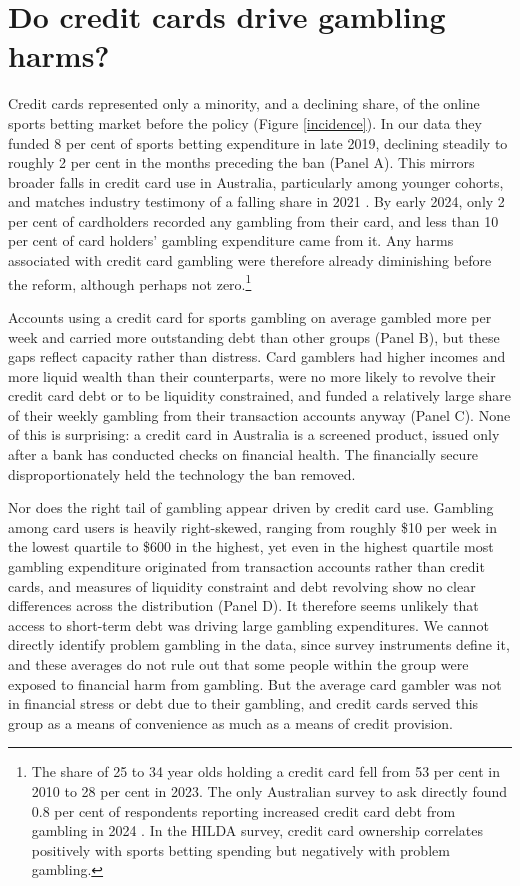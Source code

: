 \documentclass[11pt]{article}
\begin{document}
\section{Do credit cards drive gambling harms?} \label{Incidence}

Credit cards represented only a minority, and a declining share, of the online sports betting market before the policy (Figure \ref{incidence}). In our data they funded 8 per cent of sports betting expenditure in late 2019, declining steadily to roughly 2 per cent in the months preceding the ban (Panel A). This mirrors broader falls in credit card use in Australia, particularly among younger cohorts, and matches industry testimony of a falling share in 2021 . By early 2024, only 2 per cent of cardholders recorded any gambling from their card, and less than 10 per cent of card holders' gambling expenditure came from it. Any harms associated with credit card gambling were therefore already diminishing before the reform, although perhaps not zero.\footnote{The share of 25 to 34 year olds holding a credit card fell from 53 per cent in 2010 to 28 per cent in 2023. The only Australian survey to ask directly found 0.8 per cent of respondents reporting increased credit card debt from gambling in 2024 \citep{RockloffRussellBrowneHing2025}. In the HILDA survey, credit card ownership correlates positively with sports betting spending but negatively with problem gambling.}

Accounts using a credit card for sports gambling on average gambled more per week and carried more outstanding debt than other groups (Panel B), but these gaps reflect capacity rather than distress. Card gamblers had higher incomes and more liquid wealth than their counterparts, were no more likely to revolve their credit card debt or to be liquidity constrained, and funded a relatively large share of their weekly gambling from their transaction accounts anyway (Panel C). None of this is surprising: a credit card in Australia is a screened product, issued only after a bank has conducted checks on financial health. The financially secure disproportionately held the technology the ban removed.

Nor does the right tail of gambling appear driven by credit card use. Gambling among card users is heavily right-skewed, ranging from roughly \$10 per week in the lowest quartile to \$600 in the highest, yet even in the highest quartile most gambling expenditure originated from transaction accounts rather than credit cards, and measures of liquidity constraint and debt revolving show no clear differences across the distribution (Panel D). It therefore seems unlikely that access to short-term debt was driving large gambling expenditures. We cannot directly identify problem gambling in the data, since survey instruments define it, and these averages do not rule out that some people within the group were exposed to financial harm from gambling. But the average card gambler was not in financial stress or debt due to their gambling, and credit cards served this group as a means of convenience as much as a means of credit provision.
\end{document}
